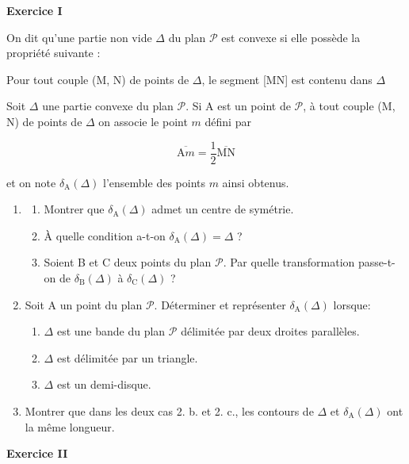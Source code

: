 \documentclass[a4paper,11pt]{article}
\begin{document}
\begin{center}\textbf{{\color{blue} Exercice I}}
\end{center}

On dit qu'une partie non vide $\Delta$ du plan $\mathcal{P}$ est convexe si elle possède la propriété suivante :

\begin{center}
Pour tout couple (M, N) de points de $\Delta$, le segment [MN] est contenu dans $\Delta$
\end{center}

Soit $\Delta$ une partie convexe du plan $\mathcal{P}$. Si A est un point de $\mathcal{P}$, à tout couple (M, N) de points de $\Delta$ on associe le point $m$ défini par

\[\overline{\text{A}m} = \dfrac12 \overline{\text{MN}}\]

et on note $\delta_{\text{A}}(\Delta)$ l'ensemble des points $m$ ainsi obtenus.

\medskip

\begin{enumerate}
\item 
	\begin{enumerate}
		\item Montrer que $\delta_{\text{A}}(\Delta)$ admet un centre de symétrie.
		\item À quelle condition a-t-on $\delta_{\text{A}}(\Delta) =\Delta$ ?
		\item Soient B et C deux points du plan $\mathcal{P}$. Par quelle transformation passe-t-on de $\delta_{\text{B}}(\Delta)$ à $\delta_{\text{C}}(\Delta)$ ?
	\end{enumerate}	
\item Soit A un point du plan $\mathcal{P}$. Déterminer et représenter $\delta_{\text{A}}(\Delta)$ lorsque:
	\begin{enumerate}
		\item $\Delta$ est une bande du plan $\mathcal{P}$ délimitée par deux droites parallèles.
		\item $\Delta$ est délimitée par un triangle.
		\item $\Delta$ est un demi-disque.
	\end{enumerate}	
\item Montrer que dans les deux cas 2. b. et 2. c., les contours de $\Delta$ et $\delta_{\text{A}}(\Delta)$ ont la même longueur.
\end{enumerate}

\begin{center}\textbf{{\color{blue} Exercice II}}
\end{center}
\end{document}
